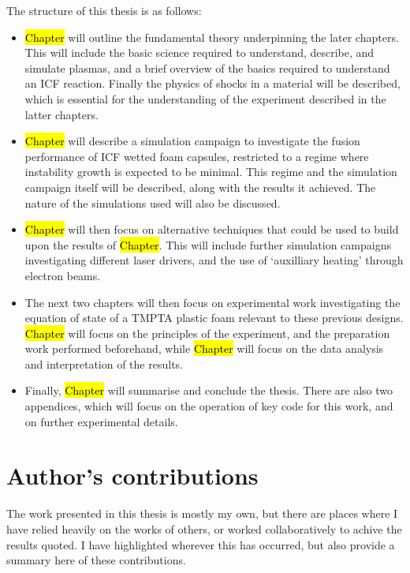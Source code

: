 The structure of this thesis is as follows:
\begin{itemize}
    \item \hl{Chapter} will outline the fundamental theory underpinning the later chapters. This will include the basic science required to understand, describe, and simulate plasmas, and a brief overview of the basics required to understand an ICF reaction. Finally the physics of shocks in a material will be described, which is essential for the understanding of the experiment described in the latter chapters.
    \item \hl{Chapter} will describe a simulation campaign to investigate the fusion performance of ICF wetted foam capsules, restricted to a regime where instability growth is expected to be minimal. This regime and the simulation campaign itself will be described, along with the results it achieved. The nature of the simulations used will also be discussed.
    \item \hl{Chapter} will then focus on alternative techniques that could be used to build upon the results of \hl{Chapter}. This will include further simulation campaigns investigating different laser drivers, and the use of `auxilliary heating' through electron beams.
    \item The next two chapters will then focus on experimental work investigating the equation of state of a TMPTA plastic foam relevant to these previous designs. \hl{Chapter} will focus on the principles of the experiment, and the preparation work performed beforehand, while \hl{Chapter} will focus on the data analysis and interpretation of the results.
    \item Finally, \hl{Chapter} will summarise and conclude the thesis. There are also two appendices, which will focus on the operation of key code for this work, and on further experimental details.
\end{itemize}

\section{Author's contributions}

The work presented in this thesis is mostly my own, but there are places where I have relied heavily on the works of others, or worked collaboratively to achive the results quoted. I have highlighted wherever this has occurred, but also provide a summary here of these contributions.

